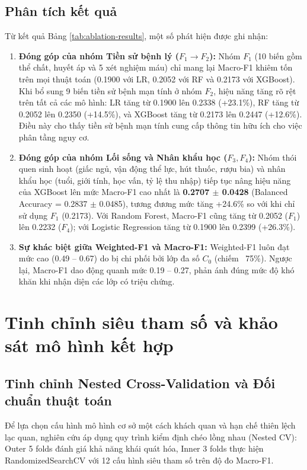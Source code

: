 \subsection{Phân tích kết quả}
Từ kết quả Bảng \ref{tab:ablation-results}, một số phát hiện được ghi nhận:
\begin{enumerate}
    \item \textbf{Đóng góp của nhóm Tiền sử bệnh lý ($F_1 \to F_2$):} Nhóm $F_1$ (10 biến gồm thể chất, huyết áp và 5 xét nghiệm máu) chỉ mang lại Macro-F1 khiêm tốn trên mọi thuật toán (0.1900 với LR, 0.2052 với RF và 0.2173 với XGBoost). Khi bổ sung 9 biến tiền sử bệnh mạn tính ở nhóm $F_2$, hiệu năng tăng rõ rệt trên tất cả các mô hình: LR tăng từ 0.1900 lên 0.2338 (+23.1\%), RF tăng từ 0.2052 lên 0.2350 (+14.5\%), và XGBoost tăng từ 0.2173 lên 0.2447 (+12.6\%). Điều này cho thấy tiền sử bệnh mạn tính cung cấp thông tin hữu ích cho việc phân tầng nguy cơ.
    \item \textbf{Đóng góp của nhóm Lối sống và Nhân khẩu học ($F_3, F_4$):} Nhóm thói quen sinh hoạt (giấc ngủ, vận động thể lực, hút thuốc, rượu bia) và nhân khẩu học (tuổi, giới tính, học vấn, tỷ lệ thu nhập) tiếp tục nâng hiệu năng của XGBoost lên mức Macro-F1 cao nhất là \textbf{0.2707 $\pm$ 0.0428} (Balanced Accuracy = 0.2837 $\pm$ 0.0485), tương đương mức tăng +24.6\% so với khi chỉ sử dụng $F_1$ (0.2173). Với Random Forest, Macro-F1 cũng tăng từ 0.2052 ($F_1$) lên 0.2232 ($F_4$); với Logistic Regression tăng từ 0.1900 lên 0.2399 (+26.3\%).
    \item \textbf{Sự khác biệt giữa Weighted-F1 và Macro-F1:} Weighted-F1 luôn đạt mức cao (0.49 -- 0.67) do bị chi phối bởi lớp đa số $C_0$ (chiếm ~75\%). Ngược lại, Macro-F1 dao động quanh mức 0.19 -- 0.27, phản ánh đúng mức độ khó khăn khi nhận diện các lớp có triệu chứng.
\end{enumerate}

\section{Tinh chỉnh siêu tham số và khảo sát mô hình kết hợp}
\label{sec:tuning-va-ensemble}

\subsection{Tinh chỉnh Nested Cross-Validation và Đối chuẩn thuật toán}
Để lựa chọn cấu hình mô hình cơ sở một cách khách quan và hạn chế thiên lệch lạc quan, nghiên cứu áp dụng quy trình kiểm định chéo lồng nhau (Nested CV): Outer 5 folds đánh giá khả năng khái quát hóa, Inner 3 folds thực hiện RandomizedSearchCV với 12 cấu hình siêu tham số trên độ đo Macro-F1.

